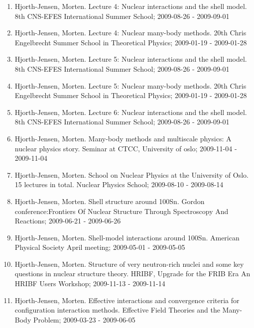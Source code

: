 \documentclass[%
oneside,                 %
final,                   %
10pt]{article}
\begin{document}
\begin{enumerate}
\item Hjorth-Jensen, Morten.  Lecture 4: Nuclear interactions and the shell model. 8th CNS-EFES International Summer School; 2009-08-26 - 2009-09-01

\item Hjorth-Jensen, Morten.  Lecture 4: Nuclear many-body methods. 20th Chris Engelbrecht Summer School in Theoretical Physics; 2009-01-19 - 2009-01-28

\item Hjorth-Jensen, Morten.  Lecture 5: Nuclear interactions and the shell model. 8th CNS-EFES International Summer School; 2009-08-26 - 2009-09-01

\item Hjorth-Jensen, Morten.  Lecture 5: Nuclear many-body methods. 20th Chris Engelbrecht Summer School in Theoretical Physics; 2009-01-19 - 2009-01-28

\item Hjorth-Jensen, Morten.  Lecture 6: Nuclear interactions and the shell model. 8th CNS-EFES International Summer School; 2009-08-26 - 2009-09-01

\item Hjorth-Jensen, Morten.  Many-body methods and multiscale physics: A nuclear physics story. Seminar at CTCC, University of oslo; 2009-11-04 - 2009-11-04

\item Hjorth-Jensen, Morten. School on Nuclear Physics at the University of Oslo. 15 lectures in total. Nuclear Physics School; 2009-08-10 - 2009-08-14

\item Hjorth-Jensen, Morten.  Shell structure around 100Sn. Gordon conference:Frontiers Of Nuclear Structure Through Spectroscopy And Reactions; 2009-06-21 - 2009-06-26

\item Hjorth-Jensen, Morten.  Shell-model interactions around 100Sn. American Physical Society April meeting; 2009-05-01 - 2009-05-05

\item Hjorth-Jensen, Morten.  Structure of very neutron-rich nuclei and some key questions in nuclear structure theory. HRIBF, Upgrade for the FRIB Era An HRIBF Users Workshop; 2009-11-13 - 2009-11-14

\item Hjorth-Jensen, Morten. Effective interactions and convergence criteria for configuration interaction methods. Effective Field Theories and the Many-Body Problem; 2009-03-23 - 2009-06-05


\end{enumerate}
\end{document}
